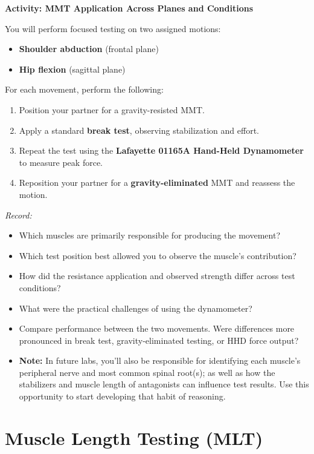 \begin{labactivitybox}
\textbf{Activity: MMT Application Across Planes and Conditions}

You will perform focused testing on two assigned motions:

\begin{itemize}
  \item \textbf{Shoulder abduction} (frontal plane)
  \item \textbf{Hip flexion} (sagittal plane)
\end{itemize}

For each movement, perform the following:

\begin{enumerate}
  \item Position your partner for a gravity-resisted MMT.
  \item Apply a standard \textbf{break test}, observing stabilization and effort.
  \item Repeat the test using the \textbf{Lafayette 01165A Hand-Held Dynamometer} to measure peak force.
  \item Reposition your partner for a \textbf{gravity-eliminated} MMT and reassess the motion.
\end{enumerate}

\textit{Record:}
\begin{itemize}
  \item Which muscles are primarily responsible for producing the movement?
  \item Which test position best allowed you to observe the muscle’s contribution?
  \item How did the resistance application and observed strength differ across test conditions?
  \item What were the practical challenges of using the dynamometer?
  \item Compare performance between the two movements. Were differences more pronounced in break test, gravity-eliminated testing, or HHD force output?
  \item \textbf{Note:} In future labs, you’ll also be responsible for identifying each muscle’s peripheral nerve and most common spinal root(s); as well as how the stabilizers and muscle length of antagonists can influence test results. Use this opportunity to start developing that habit of reasoning.
\end{itemize}
\end{labactivitybox}

\section*{Muscle Length Testing (MLT)}

